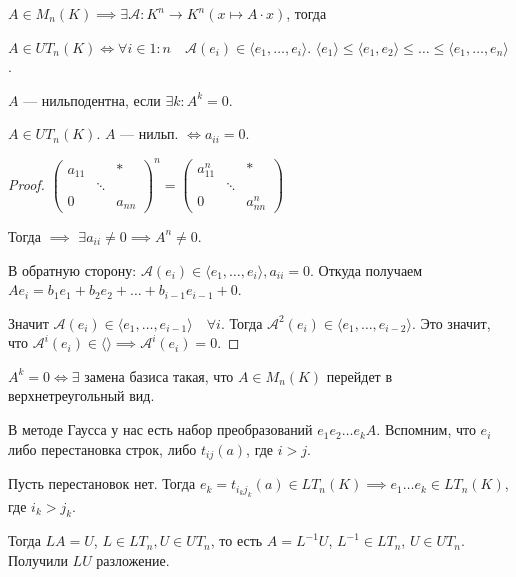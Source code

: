 \begin{remark}
    $A \in M_n(K) \implies \exists \mathcal{A}: K^n \rightarrow K^n (x \mapsto A\cdot x)$, тогда

    $A \in UT_n(K) \iff \forall i \in 1:n\quad \mathcal{A}(e_i) \in \langle e_1, \ldots, e_i \rangle$. $\langle e_1 \rangle \le \langle e_1, e_2 \rangle \le \ldots \le \langle e_1, \ldots, e_n \rangle$.
\end{remark}
\begin{definition}
    $A$ --- нильподентна, если $\exists k\!: A^k = 0$.
\end{definition}
\begin{statement}
    $A \in UT_n(K)$.  $A$ --- нильп.  $\iff a_{ii} = 0$.
\end{statement}
\begin{proof}
    $\begin{pmatrix} a_{11} & & * \\ & \ddots & \\ 0 & & a_{nn} \end{pmatrix}^n = \begin{pmatrix} a_{11}^n & & * \\ & \ddots & \\ 0 & & a_{nn}^n \end{pmatrix}$

    Тогда $\implies$ $\exists a_{ii} \not = 0 \implies A^n \not = 0$.

    В обратную сторону:  $\mathcal{A}(e_i) \in \langle e_1, \ldots, e_i \rangle, a_{ii} = 0$. Откуда получаем $Ae_i = b_1e_1 + b_2e_2 + \ldots + b_{i-1}e_{i-1} + 0$.

    Значит $\mathcal{A}(e_i) \in \langle e_1, \ldots, e_{i-1} \rangle \quad \forall i$. Тогда $\mathcal{A}^2(e_i) \in \langle e_1,\ldots, e_{i-2} \rangle$. Это значит, что $\mathcal{A}^i(e_i) \in \langle \rangle \implies \mathcal{A}^i(e_i) = 0$.
\end{proof}
\begin{remark}
    $A^k = 0 \iff \exists $ замена базиса  такая, что $A \in M_n(K)$ перейдет в верхнетреугольный вид.

\end{remark}
В методе Гаусса у нас есть набор преобразований $e_1e_2\ldots e_kA$. Вспомним, что $e_i$ либо перестановка строк, либо  $t_{ij}(a)$, где  $i > j$.

Пусть перестановок нет. Тогда  $e_k = t_{i_k j_k}(a) \in LT_n(K) \implies e_1 \ldots e_k \in LT_n(K)$, где $i_k > j_k$.

Тогда  $LA = U$,  $L \in LT_n, U \in UT_n$, то есть  $A = L^{-1}U$,  $L^{-1} \in LT_n$,  $U \in UT_n$. Получили  $LU$ разложение.

